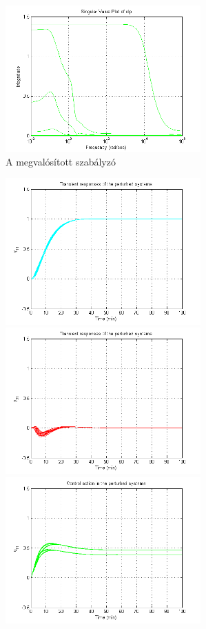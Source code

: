 \begin{figure}[!ht]\hspace{36mm}
	\includegraphics[width=75mm,keepaspectratio]{figures/2m06/hin_old_.png}
		\caption{A megvalósított szabályzó}
	\label{fig:HinOld}
\end{figure}
\begin{figure}[!ht]
	\includegraphics[width=75mm,keepaspectratio]{figures/2m06/prt_old_1.png}
	\includegraphics[width=75mm,keepaspectratio]{figures/2m06/prt_old_2.png}\vspace{2mm}
	\includegraphics[width=75mm,keepaspectratio]{figures/2m06/prt_old_3.png}

\end{figure}
